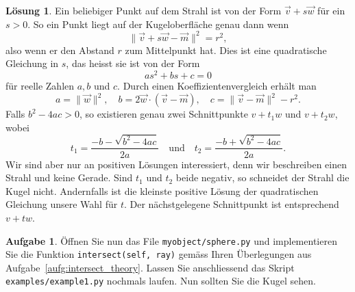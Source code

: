 \documentclass[12pt,a4paper]{article}
\theoremstyle{definition}
\newtheorem{aufgabe}{Aufgabe}
\theoremstyle{definition}
\newtheorem*{losung*}{Lösung}
\begin{document}
	\begin{losung*}
		Ein beliebiger Punkt auf dem Strahl ist von der Form $\vec{v}+s\vec{w}$ für ein $s>0$.
		So ein Punkt liegt auf der Kugeloberfläche genau dann wenn
		\begin{equation*}
			\lVert\vec{v}+s\vec{w}-\vec{m}\rVert^2=r^2,
		\end{equation*}
		also wenn er den Abstand $r$ zum Mittelpunkt hat.
		Dies ist eine quadratische Gleichung in $s$, das heisst sie ist von der Form
		\begin{equation*}
			as^2+bs+c=0
		\end{equation*}
		für reelle Zahlen $a,b$ und $c$.
		Durch einen Koeffizientenvergleich erhält man
		\begin{equation*}
			a=\rVert\vec{w}\rVert^2,\quad
			b=2\vec{w}\cdot(\vec{v}-\vec{m}),\quad
			c=\lVert\vec{v}-\vec{m}\rVert^2-r^2.
		\end{equation*}
		Falls $b^2-4ac>0$, so existieren genau zwei Schnittpunkte $v+t_1w$ und $v+t_2w$, wobei
		\begin{equation*}
			t_1=\frac{-b-\sqrt{b^2-4ac}}{2a}
			\quad\text{und}\quad
			t_2=\frac{-b+\sqrt{b^2-4ac}}{2a}.
		\end{equation*}
		Wir sind aber nur an positiven Lösungen interessiert, denn wir beschreiben einen Strahl und keine Gerade.
		Sind $t_1$ und $t_2$ beide negativ, so schneidet der Strahl die Kugel nicht.
		Andernfalls ist die kleinste positive Lösung der quadratischen Gleichung unsere Wahl für $t$.
		Der nächstgelegene Schnittpunkt ist entsprechend $v+tw$.
	\end{losung*}
	\begin{aufgabe}\label{aufg:intersect_implementation}
		Öffnen Sie nun das File \texttt{myobject/sphere.py} und implementieren Sie die Funktion \texttt{intersect(self, ray)} gemäss Ihren Überlegungen aus Aufgabe~\ref{aufg:intersect_theory}.
		Lassen Sie anschliessend das Skript \texttt{examples/example1.py} nochmals laufen.
		Nun sollten Sie die Kugel sehen.
	\end{aufgabe}
\end{document}
